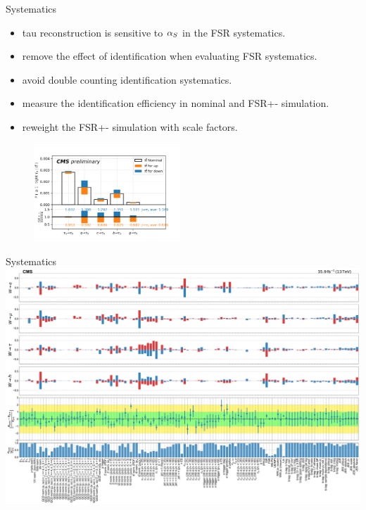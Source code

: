 \begin{frame}{Systematics}

    \begin{itemize}
    \smaller
        \item tau reconstruction is sensitive to $\alpha_S$ in the FSR systematics. 
        \item remove the effect of \PGth identification when evaluating FSR systematics.
        \item avoid double counting \PGth identification systematics.
        \item measure the \PGth identification efficiency in nominal and FSR+- simulation.
        \item reweight the FSR+- simulation with scale factors.
    \end{itemize}
        

    \begin{figure}
    \centering
    \includegraphics[width=0.49\textwidth]{chapters/Analysis/sectionSystematics/figures/ttTheoretical/2020_MCRatio_fsr_tauGenFlavor_tauTight.png}
    \end{figure}
\end{frame}

\begin{frame}{Systematics}
    \centering
    \includegraphics[width=\textwidth]{chapters/Analysis/sectionSystematics/figures/pulls_impacts_final.pdf}
\end{frame}

